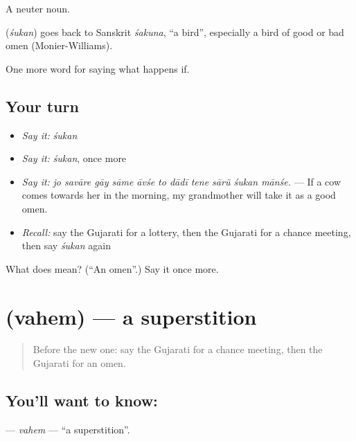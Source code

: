 A neuter noun.

\begin{cousinweb}
\textbf{} (\emph{śukan}) goes back to Sanskrit \emph{śakuna}, \textquotedblleft{}a bird\textquotedblright{}, especially a bird of good or bad omen (Monier-Williams).
\end{cousinweb}

\begin{grammarlens}[title={What you've built}]
One more word for saying what happens if.
\end{grammarlens}

\subsection*{Your turn}
\begin{itemize}
\raggedright
  \item \emph{Say it:} \emph{śukan}
  \item \emph{Say it:} \emph{śukan}, once more
  \item \emph{Say it:} \emph{jo savāre gāy sāme āvśe to dādī tene sārũ śukan mānśe.} — If a cow comes towards her in the morning, my grandmother will take it as a good omen.
  \item \emph{Recall:} say the Gujarati for a lottery, then the Gujarati for a chance meeting, then say \emph{śukan} again
\end{itemize}

\begin{tcolorbox}[breakable,colback=teal!4,colframe=teal!35!black,title={Before you move on}]
What does  mean? (\textquotedblleft{}An omen\textquotedblright{}.) Say it once more.
\end{tcolorbox}
\section[\texorpdfstring{\gu{વહેમ} (vahem)}{વહેમ (vahem)}]{ (vahem) — a superstition}

\label{lesson:GU-C535-vahem}



\begin{quote}
Before the new one: say the Gujarati for a chance meeting, then the Gujarati for an omen.
\end{quote}

\subsection*{You'll want to know: }
\textbf{} — \emph{vahem} — \textquotedblleft{}a superstition\textquotedblright{}.

